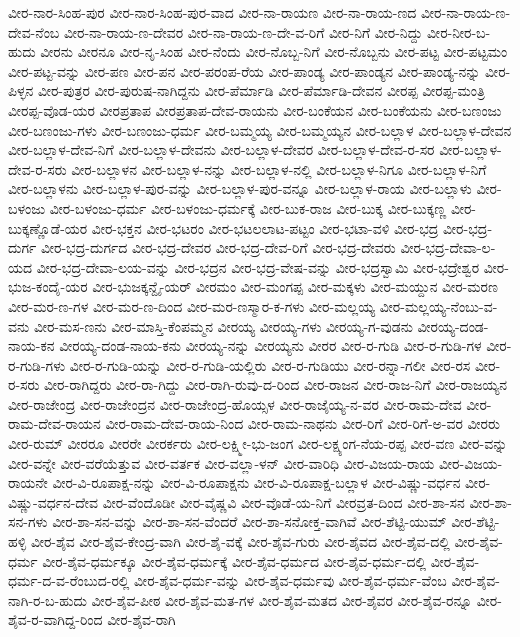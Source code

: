 ವೀರ-ನಾರ-ಸಿಂಹ-ಪುರ
ವೀರ-ನಾರ-ಸಿಂಹ-ಪುರ-ವಾದ
ವೀರ-ನಾ-ರಾಯಣ
ವೀರ-ನಾ-ರಾಯ-ಣದ
ವೀರ-ನಾ-ರಾಯ-ಣ-ದೇವ-ನೆಂಬ
ವೀರ-ನಾ-ರಾಯ-ಣ-ದೇವರ
ವೀರ-ನಾ-ರಾಯ-ಣ-ದೇ-ವ-ರಿಗೆ
ವೀರ-ನಿಗೆ
ವೀರ-ನಿದ್ದು
ವೀರ-ನೀರ-ಬ-ಹುದು
ವೀರನು
ವೀರನೂ
ವೀರ-ನೃ-ಸಿಂಹ
ವೀರ-ನೆಂದು
ವೀರ-ನೊಬ್ಬ-ನಿಗೆ
ವೀರ-ನೊಬ್ಬನು
ವೀರ-ಪಟ್ಟ
ವೀರ-ಪಟ್ಟಮಂ
ವೀರ-ಪಟ್ಟ-ವನ್ನು
ವೀರ-ಪಣ
ವೀರ-ಪನ
ವೀರ-ಪರಂಪ-ರೆಯ
ವೀರ-ಪಾಂಡ್ಯ
ವೀರ-ಪಾಂಡ್ಯನ
ವೀರ-ಪಾಂಡ್ಯ-ನನ್ನು
ವೀರ-ಪಿಳ್ಳನ
ವೀರ-ಪುತ್ರರ
ವೀರ-ಪುರುಷ-ನಾಗಿದ್ದನು
ವೀರ-ಪೆರ್ಮಾಡಿ
ವೀರ-ಪೆರ್ಮಾಡಿ-ದೇವನ
ವೀರಪ್ಪ
ವೀರಪ್ಪ-ಮಂತ್ರಿ
ವೀರಪ್ಪ-ವೊಡ-ಯರ
ವೀರಪ್ರತಾಪ
ವೀರಪ್ರತಾಪ-ದೇವ-ರಾಯನು
ವೀರ-ಬಂಕೆಯನ
ವೀರ-ಬಂಕೆಯನು
ವೀರ-ಬಣಂಜು
ವೀರ-ಬಣಂಜು-ಗಳು
ವೀರ-ಬಣಂಜು-ಧರ್ಮ
ವೀರ-ಬಮ್ಮಯ್ಯ
ವೀರ-ಬಮ್ಮಯ್ಯನ
ವೀರ-ಬಲ್ಲಾಳ
ವೀರ-ಬಲ್ಲಾಳ-ದೇವನ
ವೀರ-ಬಲ್ಲಾಳ-ದೇವ-ನಿಗೆ
ವೀರ-ಬಲ್ಲಾಳ-ದೇವನು
ವೀರ-ಬಲ್ಲಾಳ-ದೇವರ
ವೀರ-ಬಲ್ಲಾಳ-ದೇವ-ರ-ಸರ
ವೀರ-ಬಲ್ಲಾಳ-ದೇವ-ರ-ಸರು
ವೀರ-ಬಲ್ಲಾಳನ
ವೀರ-ಬಲ್ಲಾಳ-ನನ್ನು
ವೀರ-ಬಲ್ಲಾಳ-ನಲ್ಲಿ
ವೀರ-ಬಲ್ಲಾಳ-ನಿಗೂ
ವೀರ-ಬಲ್ಲಾಳ-ನಿಗೆ
ವೀರ-ಬಲ್ಲಾಳನು
ವೀರ-ಬಲ್ಲಾಳ-ಪುರ-ವನ್ನು
ವೀರ-ಬಲ್ಲಾಳ-ಪುರ-ವನ್ನೂ
ವೀರ-ಬಲ್ಲಾಳ-ರಾಯ
ವೀರ-ಬಲ್ಲಾಳು
ವೀರ-ಬಳಂಜು
ವೀರ-ಬಳಂಜು-ಧರ್ಮ
ವೀರ-ಬಳಂಜು-ಧರ್ಮಕ್ಕೆ
ವೀರ-ಬುಕ-ರಾಜ
ವೀರ-ಬುಕ್ಕ
ವೀರ-ಬುಕ್ಕಣ್ಣ
ವೀರ-ಬುಕ್ಕಣ್ಣೊಡೆ-ಯರ
ವೀರ-ಭಕ್ತನ
ವೀರ-ಭಟರಂ
ವೀರ-ಭಟಲಲಾಟ-ಪಟ್ಟಂ
ವೀರ-ಭಟಾ-ವಳಿ
ವೀರ-ಭದ್ರ
ವೀರ-ಭದ್ರ-ದುರ್ಗ
ವೀರ-ಭದ್ರ-ದುರ್ಗದ
ವೀರ-ಭದ್ರ-ದೇವರ
ವೀರ-ಭದ್ರ-ದೇವ-ರಿಗೆ
ವೀರ-ಭದ್ರ-ದೇವರು
ವೀರ-ಭದ್ರ-ದೇವಾ-ಲ-ಯದ
ವೀರ-ಭದ್ರ-ದೇವಾ-ಲಯ-ವನ್ನು
ವೀರ-ಭದ್ರನ
ವೀರ-ಭದ್ರ-ವೇಷ-ವನ್ನು
ವೀರ-ಭದ್ರಸ್ವಾಮಿ
ವೀರ-ಭದ್ರೇಶ್ವರ
ವೀರ-ಭುಜ-ಕಂದೈ-ಯರ
ವೀರ-ಭುಜಕ್ಕನ್ದೈ-ಯರ್
ವೀರಮಂ
ವೀರ-ಮಂಗಪ್ಪ
ವೀರ-ಮಕ್ಕಳು
ವೀರ-ಮಯ್ದುನ
ವೀರ-ಮರಣ
ವೀರ-ಮರ-ಣ-ಗಳ
ವೀರ-ಮರ-ಣ-ದಿಂದ
ವೀರ-ಮರ-ಣಸ್ಮಾರ-ಕ-ಗಳು
ವೀರ-ಮಲ್ಲಯ್ಯ
ವೀರ-ಮಲ್ಲಯ್ಯ-ನೆಂಬು-ವ-ವನು
ವೀರ-ಮಸ-ಣನು
ವೀರ-ಮಾಸ್ತಿ-ಕೆಂಪಮ್ಮನ
ವೀರಯ್ಯ
ವೀರಯ್ಯ-ಗಳು
ವೀರಯ್ಯ-ಗ-ವುಡನು
ವೀರಯ್ಯ-ದಂಡ-ನಾಯ-ಕನ
ವೀರಯ್ಯ-ದಂಡ-ನಾಯ-ಕನು
ವೀರಯ್ಯ-ನನ್ನು
ವೀರಯ್ಯನು
ವೀರರ
ವೀರ-ರ-ಗುಡಿ
ವೀರ-ರ-ಗುಡಿ-ಗಳ
ವೀರ-ರ-ಗುಡಿ-ಗಳು
ವೀರ-ರ-ಗುಡಿ-ಯನ್ನು
ವೀರ-ರ-ಗುಡಿ-ಯಲ್ಲಿರು
ವೀರ-ರ-ಗುಡಿಯು
ವೀರ-ರನ್ನಾ-ಗಲೀ
ವೀರ-ರಸ
ವೀರ-ರ-ಸರು
ವೀರ-ರಾಗಿದ್ದರು
ವೀರ-ರಾ-ಗಿದ್ದು
ವೀರ-ರಾಗಿ-ರುವು-ದ-ರಿಂದ
ವೀರ-ರಾಜನ
ವೀರ-ರಾಜ-ನಿಗೆ
ವೀರ-ರಾಜಯ್ಯನ
ವೀರ-ರಾಜೇಂದ್ರ
ವೀರ-ರಾಜೇಂದ್ರನ
ವೀರ-ರಾಜೇಂದ್ರ-ಹೊಯ್ಸಳ
ವೀರ-ರಾಜೈಯ್ಯ-ನ-ವರ
ವೀರ-ರಾಮ-ದೇವ
ವೀರ-ರಾಮ-ದೇವ-ರಾಯನ
ವೀರ-ರಾಮ-ದೇವ-ರಾಯ-ನಿಂದ
ವೀರ-ರಾಮ-ನಾಥನು
ವೀರ-ರಿಗೆ
ವೀರ-ರಿಗೆ-ಅ-ವರ
ವೀರರು
ವೀರ-ರುಮ್
ವೀರರೂ
ವೀರರೇ
ವೀರರ್ಕರು
ವೀರ-ಲಕ್ಷ್ಮೀ-ಭು-ಜಂಗ
ವೀರ-ಲಕ್ಷ್ಯಂಗ-ನೆಯ-ರಪ್ಪ
ವೀರ-ವಣ
ವೀರ-ವನ್ನು
ವೀರ-ವನ್ನೇ
ವೀರ-ವರೆಯೆತ್ತುವ
ವೀರ-ವರ್ತಕ
ವೀರ-ವಲ್ಲಾ-ಳನ್
ವೀರ-ವಾರಿಧಿ
ವೀರ-ವಿಜಯ-ರಾಯ
ವೀರ-ವಿಜಯ-ರಾಯನೇ
ವೀರ-ವಿ-ರೂಪಾಕ್ಷ-ನನ್ನು
ವೀರ-ವಿ-ರೂಪಾಕ್ಷನು
ವೀರ-ವಿ-ರೂಪಾಕ್ಷ-ಬಲ್ಲಾಳ
ವೀರ-ವಿಷ್ಣು-ವರ್ಧನ
ವೀರ-ವಿಷ್ಣು-ವರ್ಧನ-ದೇವ
ವೀರ-ವೆಂದೊಡೀ
ವೀರ-ವೈಷ್ಣವಿ
ವೀರ-ವೊಡೆ-ಯ-ನಿಗೆ
ವೀರವ್ರತ-ದಿಂದ
ವೀರ-ಶಾ-ಸನ
ವೀರ-ಶಾ-ಸನ-ಗಳು
ವೀರ-ಶಾ-ಸನ-ವನ್ನು
ವೀರ-ಶಾ-ಸನ-ವೆಂದರೆ
ವೀರ-ಶಾ-ಸನೋಕ್ತ-ವಾಗಿವೆ
ವೀರ-ಶೆಟ್ಟಿ-ಯುಮ್
ವೀರ-ಶೆಟ್ಟಿ-ಹಳ್ಳಿ
ವೀರ-ಶೈವ
ವೀರ-ಶೈವ-ಕೇಂದ್ರ-ವಾಗಿ
ವೀರ-ಶೈ-ವಕ್ಕೆ
ವೀರ-ಶೈವ-ಗುರು
ವೀರ-ಶೈವದ
ವೀರ-ಶೈವ-ದಲ್ಲಿ
ವೀರ-ಶೈವ-ಧರ್ಮ
ವೀರ-ಶೈವ-ಧರ್ಮಕ್ಕೂ
ವೀರ-ಶೈವ-ಧರ್ಮಕ್ಕೆ
ವೀರ-ಶೈವ-ಧರ್ಮದ
ವೀರ-ಶೈವ-ಧರ್ಮ-ದಲ್ಲಿ
ವೀರ-ಶೈವ-ಧರ್ಮ-ದ-ವ-ರೆಂಬುದ-ರಲ್ಲಿ
ವೀರ-ಶೈವ-ಧರ್ಮ-ವನ್ನು
ವೀರ-ಶೈವ-ಧರ್ಮವು
ವೀರ-ಶೈವ-ಧರ್ಮ-ವೆಂಬ
ವೀರ-ಶೈವ-ನಾಗಿ-ರ-ಬ-ಹುದು
ವೀರ-ಶೈವ-ಪೀಠ
ವೀರ-ಶೈವ-ಮತ-ಗಳ
ವೀರ-ಶೈವ-ಮತದ
ವೀರ-ಶೈವರ
ವೀರ-ಶೈವ-ರನ್ನೂ
ವೀರ-ಶೈವ-ರ-ವಾಗಿದ್ದ-ರಿಂದ
ವೀರ-ಶೈವ-ರಾಗಿ
